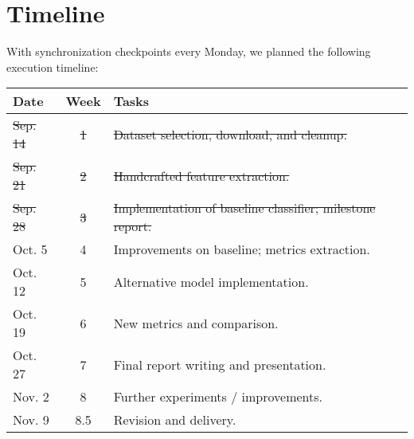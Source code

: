 \section{Timeline}

With synchronization checkpoints every Monday, we planned the following execution timeline:

\begin{table}[h]
    \begin{tabular}{lcl}
    \textbf{Date}    & \multicolumn{1}{l}{\textbf{Week}} & \textbf{Tasks}                                        \\ \hline
    \st{Sep. 14} & \st{1}                        & \st{Dataset selection, download, and cleanup.}                \\
    \st{Sep. 21} & \st{2}                        & \st{Handcrafted feature extraction.}                          \\
    \st{Sep. 28} & \st{3}                        & \st{Implementation of baseline classifier; milestone report.} \\
    Oct. 5  & 4   & Improvements on baseline; metrics extraction. \\
    Oct. 12 & 5   & Alternative model implementation.             \\
    Oct. 19 & 6   & New metrics and comparison.                   \\
    Oct. 27 & 7   & Final report writing and presentation.        \\
    Nov. 2  & 8   & Further experiments / improvements.           \\
    Nov. 9  & 8.5 & Revision and delivery.                       
    \end{tabular}
\end{table}
